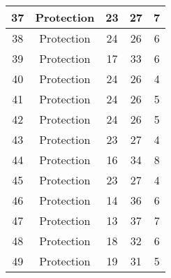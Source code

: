 \documentclass[results.tex]{subfiles}
\begin{document}
\begin{center}
\begin{tabular}{| c || c | c | c | c |}
            \hline
            37                      & Protection                   & 23                     & 27                      & 7                    \\
            \hline
            38                      & Protection                   & 24                     & 26                      & 6                    \\
            \hline
            39                      & Protection                   & 17                     & 33                      & 6                    \\
            \hline
            40                      & Protection                   & 24                     & 26                      & 4                    \\
            \hline
            41                      & Protection                   & 24                     & 26                      & 5                    \\
            \hline
            42                      & Protection                   & 24                     & 26                      & 5                    \\
            \hline
            43                      & Protection                   & 23                     & 27                      & 4                    \\
            \hline
            44                      & Protection                   & 16                     & 34                      & 8                    \\
            \hline
            45                      & Protection                   & 23                     & 27                      & 4                    \\
            \hline
            46                      & Protection                   & 14                     & 36                      & 6                    \\
            \hline
            47                      & Protection                   & 13                     & 37                      & 7                    \\
            \hline
            48                      & Protection                   & 18                     & 32                      & 6                    \\
            \hline
            49                      & Protection                   & 19                     & 31                      & 5                    \\
            \hline
        \end{tabular}
    \end{center}
\end{document}
